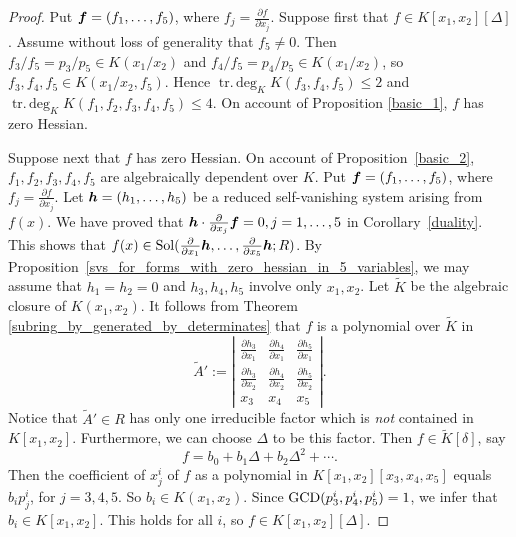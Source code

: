 \documentclass[12pt]{article}
\theoremstyle{definition}
\theoremstyle{remark}
\def\sol{{\rm Sol}}
\def\boldh{\mbox{\boldmath $h$}}
\def\boldf{\mbox{\boldmath $f$}}
\def\pa{\partial}
\def\trdeg{\operatorname{tr.\,deg}}
\begin{document}
\begin{proof}
Put $\boldf=(f_1, \ldots, f_5)$, where $f_j=\frac{\pa f}{\pa x_j}$.  
Suppose first that $f \in K[x_1,x_2][\Delta]$.    Assume without loss of generality that
$f_5 \ne 0$. Then $f_3/f_5 = p_3/p_5 \in K(x_1/x_2)$ and 
$f_4/f_5 = p_4/p_5 \in K(x_1/x_2)$, so $f_3,f_4,f_5 \in K(x_1/x_2,f_5)$.
Hence $\trdeg_K K(f_3,f_4,f_5) \le 2$ and 
$\trdeg_K K(f_1,f_2,f_3,f_4,f_5) \le 4$.
On account of Proposition \ref{basic_1}, $f$ has zero Hessian.

Suppose next that $f$ has zero Hessian. On account of Proposition~\ref{basic_2},
$f_1,f_2,f_3,f_4,f_5$ are algebraically dependent over $K$.
Put $\boldf=(f_1, \ldots, f_5)$, where $f_j=\frac{\pa f}{\pa x_j}$.  
Let $\boldh=(h_1, \ldots, h_5)$ be a reduced 
self-vanishing system arising from $f(x)$.  We have proved that 
$\boldh \cdot \frac{\pa}{\pa x_j}\boldf=0,  j=1,\ldots, 5$ in Corollary~\ref{duality}. 
This shows that $f(x) \in \sol(\frac{\pa}{\pa x_1}\boldh, \ldots, \frac{\pa}{\pa x_5}\boldh; R)$. 
By Proposition~\ref{svs_for_forms_with_zero_hessian_in_5_variables}, we may assume that 
$h_1=h_2=0$ and $h_3, h_4, h_5$ involve only $x_1, x_2$. Let $\tilde{K}$ be the algebraic
closure of $K(x_1,x_2)$. It follows from
Theorem \ref{subring_by_generated_by_determinates} that $f$ is a polynomial
over $\tilde{K}$ in
$$
\tilde{A}' := 
\left| \begin{array}{ccc}
\frac{\pa h_3}{\pa x_1} & \frac{\pa h_4}{\pa x_1} & \frac{\pa h_5}{\pa x_1} \\[5pt]
\frac{\pa h_3}{\pa x_2} & \frac{\pa h_4}{\pa x_2} & \frac{\pa h_5}{\pa x_2} \\[4pt]
\hline
x_3 & x_4 & x_5
\end{array} \right|. 
$$
Notice that $\tilde{A}' \in R$ has only one irreducible factor which is \emph{not} 
contained in $K[x_1,x_2]$. Furthermore, we can choose $\Delta$ to be this factor.
Then $f \in \tilde{K}[\delta]$, say 
$$
f = b_0 + b_1 \Delta + b_2 \Delta^2 + \cdots .
$$
Then the coefficient of $x_j^i$ of $f$ as a polynomial in $K[x_1,x_2][x_3,x_4,x_5]$
equals $b_i p_j^i$, for $j=3,4,5$. So $b_i \in K(x_1,x_2)$.
Since ${\rm GCD}(p_3^i,p_4^i,p_5^i) = 1$, we infer that $b_i \in K[x_1,x_2]$.
This holds for all $i$, so $f \in K[x_1,x_2][\Delta]$.
\end{proof}
\end{document}
